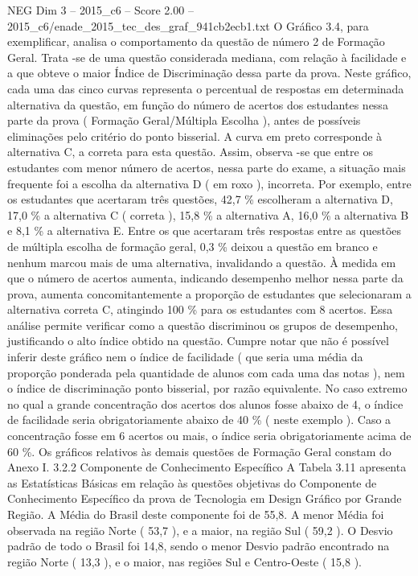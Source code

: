 \begin{textsample}{NEG Dim 3 – 2015\_c6 – Score 2.00 – 2015\_c6/enade\_2015\_tec\_des\_graf\_941cb2ecb1.txt}
O Gráfico 3.4, para exemplificar, analisa o comportamento da questão de número 2 de Formação Geral.
Trata -se de uma questão considerada mediana, com relação à facilidade e a que obteve o maior Índice de Discriminação dessa parte da prova.
Neste gráfico, cada uma das cinco curvas representa o percentual de respostas em determinada alternativa da questão, em função do número de acertos dos estudantes nessa parte da prova ( Formação Geral/Múltipla Escolha ), antes de possíveis eliminações pelo critério do ponto bisserial.
A curva em preto corresponde à alternativa C, a correta para esta questão.
Assim, observa -se que entre os estudantes com menor número de acertos, nessa parte do exame, a situação mais frequente foi a escolha da alternativa D ( em roxo ), incorreta.
Por exemplo, entre os estudantes que acertaram três questões, 42,7 \% escolheram a alternativa D, 17,0 \% a alternativa C ( correta ), 15,8 \% a alternativa A, 16,0 \% a alternativa B e 8,1 \% a alternativa E.
Entre os que acertaram três respostas entre as questões de múltipla escolha de formação geral, 0,3 \% deixou a questão em branco e nenhum marcou mais de uma alternativa, invalidando a questão.
À medida em que o número de acertos aumenta, indicando desempenho melhor nessa parte da prova, aumenta concomitantemente a proporção de estudantes que selecionaram a alternativa correta C, atingindo 100 \% para os estudantes com 8 acertos.
Essa análise permite verificar como a questão discriminou os grupos de desempenho, justificando o alto índice obtido na questão.
Cumpre notar que não é possível inferir deste gráfico nem o índice de facilidade ( que seria uma média da proporção ponderada pela quantidade de alunos com cada uma das notas ), nem o índice de discriminação ponto bisserial, por razão equivalente.
No caso extremo no qual a grande concentração dos acertos dos alunos fosse abaixo de 4, o índice de facilidade seria obrigatoriamente abaixo de 40 \% ( neste exemplo ).
Caso a concentração fosse em 6 acertos ou mais, o índice seria obrigatoriamente acima de 60 \%.
Os gráficos relativos às demais questões de Formação Geral constam do Anexo I. 3.2.2 Componente de Conhecimento Específico A Tabela 3.11 apresenta as Estatísticas Básicas em relação às questões objetivas do Componente de Conhecimento Específico da prova de Tecnologia em Design Gráfico por Grande Região.
A Média do Brasil deste componente foi de 55,8.
A menor Média foi observada na região Norte ( 53,7 ), e a maior, na região Sul ( 59,2 ).
O Desvio padrão de todo o Brasil foi 14,8, sendo o menor Desvio padrão encontrado na região Norte ( 13,3 ), e o maior, nas regiões Sul e Centro-Oeste ( 15,8 ).

\end{textsample}
